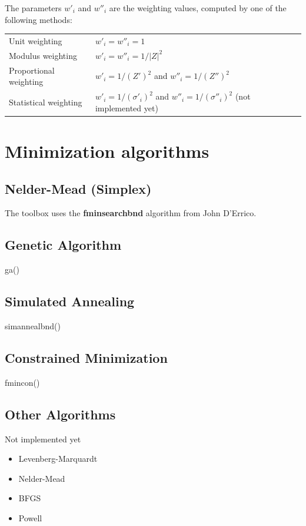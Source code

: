 \documentclass[9pt,a4paper,oneside]{book}
\begin{document}
The parameters $w'_i$ and $w''_i$ are the weighting values, computed by one of the following methods:

\begin{tabular}{ll}
	Unit weighting 			& $w'_i = w''_i = 1$ \\
	Modulus weighting 		& $w'_i = w''_i = 1/|Z|^2$ \\
	Proportional weighting 	& $w'_i = 1/(Z')^2$ and $w''_i = 1/(Z'')^2$ \\
	Statistical weighting 	& $w'_i = 1/(\sigma'_i)^2$ and $w''_i = 1/(\sigma''_i)^2$ (not implemented yet)\\
\end{tabular}


\newpage
\section{Minimization algorithms}

\subsection{Nelder-Mead (Simplex)}

The toolbox uses the \textbf{fminsearchbnd} algorithm from John D'Errico.

\subsection{Genetic Algorithm}

ga()

\subsection{Simulated Annealing}

simannealbnd()

\subsection{Constrained Minimization}

fmincon()

\subsection{Other Algorithms}

Not implemented yet

\begin{itemize}
	\item Levenberg-Marquardt
	\item Nelder-Mead
	\item BFGS
	\item Powell
\end{itemize}
\end{document}

